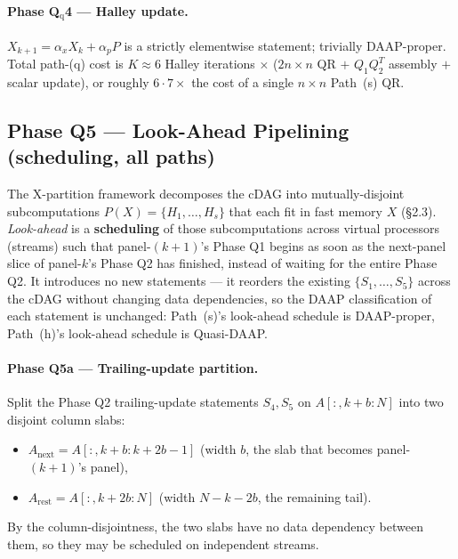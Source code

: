 \documentclass[11pt]{article}
\begin{document}
\paragraph{Phase Q$_{\mathrm{q}}$4 --- Halley update.}
$X_{k+1} = \alpha_x X_k + \alpha_p P$ is a strictly elementwise
statement; trivially DAAP-proper.  Total path-(q) cost is
$K \approx 6$ Halley iterations $\times$ ($2n \times n$ QR
$+$ $Q_1 Q_2^T$ assembly $+$ scalar update), or roughly
$6 \cdot 7\times$ the cost of a single $n \times n$ Path~(s) QR.

\subsection*{Phase Q5 --- Look-Ahead Pipelining (scheduling, all paths)}
\label{sec:A1-lookahead}

The X-partition framework decomposes the cDAG into mutually-disjoint
subcomputations $P(X) = \{H_1, \dots, H_s\}$ that each fit in fast
memory $X$ (\S2.3). \emph{Look-ahead} is a \textbf{scheduling} of those
subcomputations across virtual processors (streams) such that
panel-$(k{+}1)$'s Phase Q1 begins as soon as the next-panel slice of
panel-$k$'s Phase Q2 has finished, instead of waiting for the entire
Phase Q2. It introduces no new statements --- it reorders the existing
$\{S_1, \dots, S_5\}$ across the cDAG without changing data
dependencies, so the DAAP classification of each statement is
unchanged: Path~(s)'s look-ahead schedule is DAAP-proper, Path~(h)'s
look-ahead schedule is Quasi-DAAP.

\paragraph{Phase Q5a --- Trailing-update partition.}
Split the Phase Q2 trailing-update statements $S_4, S_5$ on
$A[:, k{+}b : N]$ into two disjoint column slabs:
\begin{itemize}[leftmargin=2em]
  \item $A_{\text{next}} = A[:, k{+}b : k{+}2b{-}1]$ \quad (width $b$,
        the slab that becomes panel-$(k{+}1)$'s panel),
  \item $A_{\text{rest}} = A[:, k{+}2b : N]$ \quad (width $N - k - 2b$,
        the remaining tail).
\end{itemize}
By the column-disjointness, the two slabs have no data dependency
between them, so they may be scheduled on independent streams.
\end{document}
